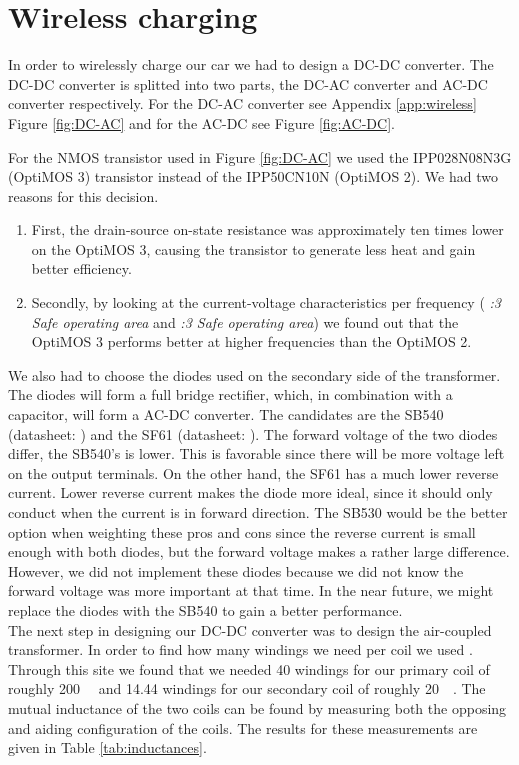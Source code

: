 \documentclass[final]{scrreprt} %
\begin{document}
\chapter{Wireless charging}
In order to wirelessly charge our car we had to design a DC-DC converter. The DC-DC converter is splitted into two parts, the DC-AC converter and AC-DC converter respectively. 
For the DC-AC converter see Appendix \ref{app:wireless} Figure \ref{fig:DC-AC} and for the AC-DC see Figure \ref{fig:AC-DC}.


For the NMOS transistor used in Figure \ref{fig:DC-AC} we used the IPP028N08N3G (OptiMOS 3) transistor instead of the IPP50CN10N (OptiMOS 2).
We had two reasons for this decision.
\begin{enumerate}
\item First, the drain-source on-state resistance was approximately ten times lower on the OptiMOS 3, causing the transistor to generate less heat and gain better efficiency.
\item Secondly, by looking at the current-voltage characteristics per frequency (\cite{OptiMOS2} \emph{:3 Safe operating area} and \cite{OptiMOS3} \emph{:3 Safe operating area}) we found out that the OptiMOS 3 performs better at higher frequencies than the OptiMOS 2.
\end{enumerate}

We also had to choose the diodes used on the secondary side of the transformer. 
The diodes will form a full bridge rectifier, which, in combination with a capacitor, will form a AC-DC converter.
The candidates are the SB540 (datasheet: \cite{SB540}) and the SF61 (datasheet: \cite{SF61}).
The forward voltage of the two diodes differ, the SB540's is lower. 
This is favorable since there will be more voltage left on the output terminals.
On the other hand, the SF61 has a much lower reverse current. 
Lower reverse current makes the diode more ideal, since it should only conduct when the current is in forward direction.
The SB530 would be the better option when weighting these pros and cons since the reverse current is small enough with both diodes, but the forward voltage makes a rather large difference.
However, we did not implement these diodes because we did not know the forward voltage was more important at that time.
In the near future, we might replace the diodes with the SB540 to gain a better performance. \\


The next step in designing our DC-DC converter was to design the air-coupled transformer. 
In order to find how many windings we need per coil we used \cite{windings}.
Through this site we found that we needed 40 windings for our primary coil of roughly \SI{200}{\micro\henri} and 14.44 windings for our secondary coil of roughly \SI{20}{\micro\henri}.
The mutual inductance of the two coils can be found by measuring both the opposing and aiding configuration of the coils. 
The results for these measurements are given in Table \ref{tab:inductances}.
\end{document}
